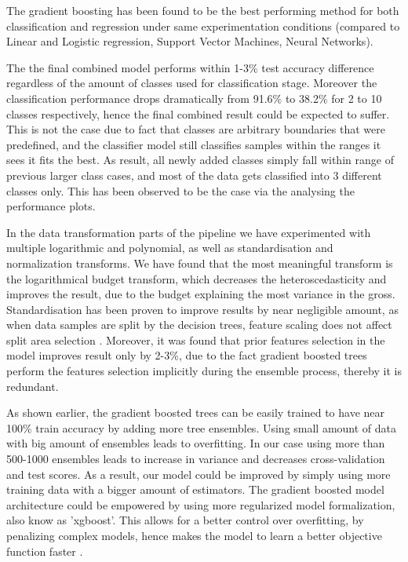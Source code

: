The gradient boosting has been found to be the best performing method for both classification and regression under same experimentation conditions (compared to Linear and Logistic regression, Support Vector Machines, Neural Networks). 

The the final combined model performs within 1-3\% test accuracy difference regardless of the amount of classes used for classification stage. Moreover the classification performance drops dramatically from 91.6\% to 38.2\% for 2 to 10 classes respectively, hence the final combined result could be expected to suffer. This is not the case due to fact that classes are arbitrary boundaries that were predefined, and the classifier model still classifies samples within the ranges it sees it fits the best. As result, all newly added classes simply fall within range of previous larger class cases, and most of the data gets classified into 3 different classes only. This has been observed to be the case via the analysing the performance plots.

In the data transformation parts of the pipeline we have experimented with multiple logarithmic and polynomial, as well as standardisation and  normalization transforms. We have found that the most meaningful transform  is the logarithmical budget transform, which decreases the heteroscedasticity and improves the result, due to the budget explaining the most variance in the gross. Standardisation has been proven to improve results by near negligible  amount, as when data samples are split by the decision trees, feature scaling does not affect split area selection \cite{chen2014introduction}. Moreover, it was found that prior features selection in the model improves result only by  2-3\%, due to the fact gradient boosted trees perform the features selection implicitly during the ensemble process, thereby it is redundant.

As shown earlier, the gradient boosted trees can be easily trained to have near 100\% train accuracy by adding more tree ensembles. Using small amount of data with big amount of ensembles leads to overfitting. In our case using more than 500-1000 ensembles leads to increase in variance and decreases cross-validation and  test scores. As a result, our model could be improved by simply using more training data with a bigger amount of estimators. The gradient boosted model architecture could be empowered by using more regularized model formalization, also know as 'xgboost'. This allows for a better control over overfitting, by penalizing complex models, hence makes the model to learn a better objective function faster \cite{chen2015}.  

